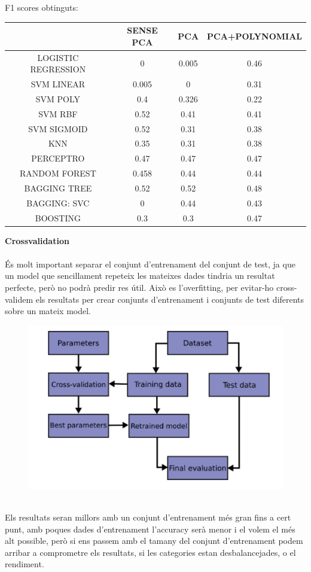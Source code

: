 \documentclass{article}
\begin{document}
F1 scores obtinguts:\\
\begin{center}
	\begin{tabular}{|c|c|c|c|}\hline
		&SENSE PCA&		PCA&		PCA+POLYNOMIAL\\ \hline
		LOGISTIC REGRESSION& 0  & 0.005	& 0.46\\ \hline
		SVM	LINEAR& 0.005	& 0		& 0.31\\ \hline
		SVM POLY& 0.4	& 0.326	& 0.22\\ \hline
		SVM RBF& 0.52	&0.41	& 0.41\\ \hline
		SVM SIGMOID& 0.52	& 0.31	& 0.38\\ \hline
		KNN& 0.35		& 0.31	& 0.38\\ \hline
		PERCEPTRO& 0.47		& 0.47	& 0.47\\ \hline
		RANDOM FOREST& 0.458		& 0.44	& 0.44\\ \hline
		BAGGING TREE &0.52	&0.52	& 0.48\\ \hline
		BAGGING: SVC & 0	& 0.44	&0.43\\ \hline
		BOOSTING& 0.3 & 0.3 & 0.47\\ \hline
	\end{tabular}
\end{center}
	\textbf{Crossvalidation}\\
	\\
	És molt important separar el conjunt d'entrenament del conjunt de test, ja que un model que sencillament repeteix les mateixes dades tindria un resultat perfecte, però no podrà predir res útil. Això es l'overfitting, per evitar-ho cross-validem els resultats per crear conjunts d'entrenament i conjunts de test diferents sobre un mateix model.\\
	\begin{figure}[!h]
		\centering
		\includegraphics[width=0.4\linewidth]{../images/crossvalidation}
		\caption*{}
		\label{fig:crossvalidation}
	\end{figure}\\
	Els resultats seran millors amb un conjunt d'entrenament més gran fins a cert punt, amb poques dades d'entrenament l'accuracy serà menor i el volem el més alt possible, però si ens passem amb el tamany del conjunt d'entrenament podem arribar a comprometre els resultats, si les categories estan desbalancejades, o el rendiment.\\
\end{document}
